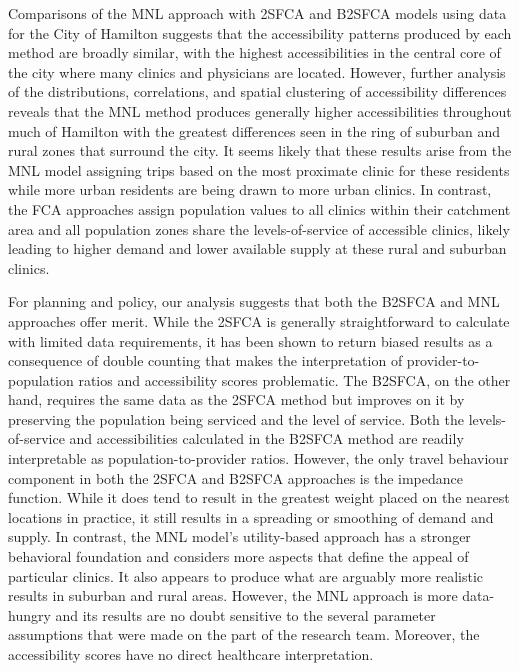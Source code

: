 \documentclass[]{elsarticle} %
\begin{document}
Comparisons of the MNL approach with 2SFCA and B2SFCA models using data
for the City of Hamilton suggests that the accessibility patterns
produced by each method are broadly similar, with the highest
accessibilities in the central core of the city where many clinics and
physicians are located. However, further analysis of the distributions,
correlations, and spatial clustering of accessibility differences
reveals that the MNL method produces generally higher accessibilities
throughout much of Hamilton with the greatest differences seen in the
ring of suburban and rural zones that surround the city. It seems likely
that these results arise from the MNL model assigning trips based on the
most proximate clinic for these residents while more urban residents are
being drawn to more urban clinics. In contrast, the FCA approaches
assign population values to all clinics within their catchment area and
all population zones share the levels-of-service of accessible clinics,
likely leading to higher demand and lower available supply at these
rural and suburban clinics.

For planning and policy, our analysis suggests that both the B2SFCA and
MNL approaches offer merit. While the 2SFCA is generally straightforward
to calculate with limited data requirements, it has been shown to return
biased results as a consequence of double counting that makes the
interpretation of provider-to-population ratios and accessibility scores
problematic. The B2SFCA, on the other hand, requires the same data as
the 2SFCA method but improves on it by preserving the population being
serviced and the level of service. Both the levels-of-service and
accessibilities calculated in the B2SFCA method are readily
interpretable as population-to-provider ratios. However, the only travel
behaviour component in both the 2SFCA and B2SFCA approaches is the
impedance function. While it does tend to result in the greatest weight
placed on the nearest locations in practice, it still results in a
spreading or smoothing of demand and supply. In contrast, the MNL
model's utility-based approach has a stronger behavioral foundation and
considers more aspects that define the appeal of particular clinics. It
also appears to produce what are arguably more realistic results in
suburban and rural areas. However, the MNL approach is more data-hungry
and its results are no doubt sensitive to the several parameter
assumptions that were made on the part of the research team. Moreover,
the accessibility scores have no direct healthcare interpretation.
\end{document}
